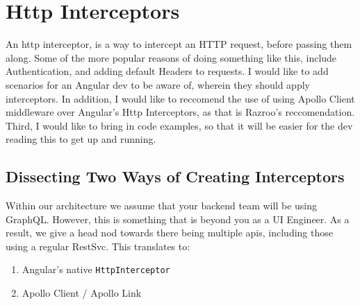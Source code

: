 \section{ Http Interceptors }
\maketitle{}

An http interceptor, is a way to intercept an HTTP request, before passing them
along. Some of the more popular reasons of doing something like this, include 
Authentication, and adding default Headers to requests. I would like to add 
scenarios for an Angular dev to be aware of, wherein they should apply 
interceptors. In addition, I would like to reccomend the use of using Apollo 
Client middleware over Angular's Http Interceptors, as that is Razroo's 
reccomendation. Third, I would like to bring in code examples, so that it will
be easier for the dev reading this to get up and running.

\subsection{Dissecting Two Ways of Creating Interceptors}
Within our architecture we assume that your backend team will be using GraphQL. 
However, this is something that is beyond you as a UI Engineer. As a result,
we give a head nod towards there being multiple apis, including those using a 
regular RestSvc. This translates to: 
\begin{enumerate}
  \item Angular's native \lstinline{HttpInterceptor}
  \item Apollo Client / Apollo Link
\end{enumerate}

